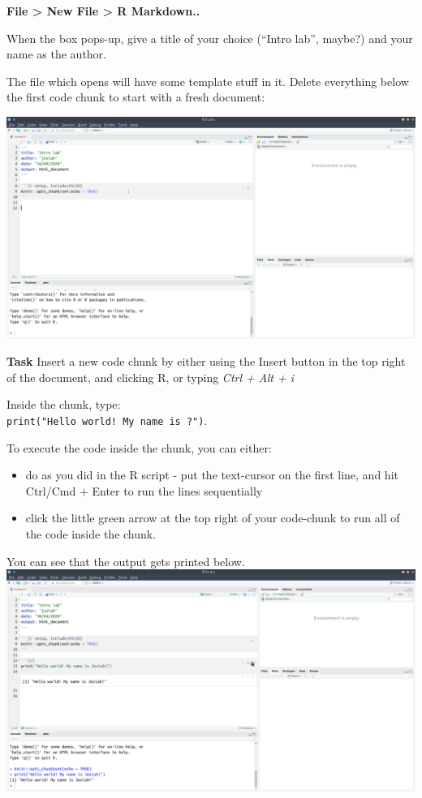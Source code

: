 \documentclass[]{book}
\providecommand{\tightlist}{%
  \setlength{\itemsep}{0pt}\setlength{\parskip}{0pt}}
\begin{document}
\textbf{File \textgreater{} New File \textgreater{} R Markdown..}

When the box pops-up, give a title of your choice (``Intro lab'', maybe?) and your name as the author.

The file which opens will have some template stuff in it. Delete everything below the first code chunk to start with a fresh document:

\includegraphics{images/installing_intro/ss_newrmd.png}

\textbf{Task}
Insert a new code chunk by either using the Insert button in the top right of the document, and clicking R, or typing \emph{Ctrl + Alt + i}

Inside the chunk, type:\\
\texttt{print("Hello\ world!\ My\ name\ is\ ?")}.

To execute the code inside the chunk, you can either:

\begin{itemize}
\tightlist
\item
  do as you did in the R script - put the text-cursor on the first line, and hit Ctrl/Cmd + Enter to run the lines sequentially
\item
  click the little green arrow at the top right of your code-chunk to run all of the code inside the chunk.
\end{itemize}

You can see that the output gets printed below.
\includegraphics{images/installing_intro/runchunk.png}
\end{document}

